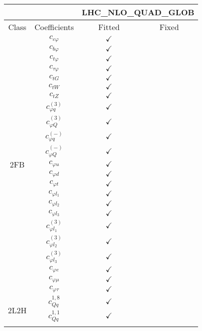 \documentclass{article}
\begin{document}
\begin{table}[H]
\centering
\begin{tabular}{|c|c|c|c|}
\hline
 &  & \multicolumn{2}{c|}{LHC_NLO_QUAD_GLOB} \\ \hline
Class & Coefficients & Fitted & Fixed  \\ \hline
\multirow{23}{*}{2FB}
 & $c_{c \varphi}$ & $\checkmark$ & \\ \cline{2-4}
 & $c_{b \varphi}$ & $\checkmark$ & \\ \cline{2-4}
 & $c_{t \varphi}$ & $\checkmark$ & \\ \cline{2-4}
 & $c_{\tau \varphi}$ & $\checkmark$ & \\ \cline{2-4}
 & $c_{tG}$ & $\checkmark$ & \\ \cline{2-4}
 & $c_{tW}$ & $\checkmark$ & \\ \cline{2-4}
 & $c_{tZ}$ & $\checkmark$ & \\ \cline{2-4}
 & $c_{\varphi q}^{(3)}$ & $\checkmark$ & \\ \cline{2-4}
 & $c_{\varphi Q}^{(3)}$ & $\checkmark$ & \\ \cline{2-4}
 & $c_{\varphi q}^{(-)}$ & $\checkmark$ & \\ \cline{2-4}
 & $c_{\varphi Q}^{(-)}$ & $\checkmark$ & \\ \cline{2-4}
 & $c_{\varphi u}$ & $\checkmark$ & \\ \cline{2-4}
 & $c_{\varphi d}$ & $\checkmark$ & \\ \cline{2-4}
 & $c_{\varphi t}$ & $\checkmark$ & \\ \cline{2-4}
 & $c_{\varphi l_1}$ & $\checkmark$ & \\ \cline{2-4}
 & $c_{\varphi l_2}$ & $\checkmark$ & \\ \cline{2-4}
 & $c_{\varphi l_3}$ & $\checkmark$ & \\ \cline{2-4}
 & $c_{\varphi l_1}^{(3)}$ & $\checkmark$ & \\ \cline{2-4}
 & $c_{\varphi l_2}^{(3)}$ & $\checkmark$ & \\ \cline{2-4}
 & $c_{\varphi l_3}^{(3)}$ & $\checkmark$ & \\ \cline{2-4}
 & $c_{\varphi e}$ & $\checkmark$ & \\ \cline{2-4}
 & $c_{\varphi \mu}$ & $\checkmark$ & \\ \cline{2-4}
 & $c_{\varphi \tau}$ & $\checkmark$ & 
\\ \hline
\multirow{14}{*}{2L2H}
 & $c_{Qq}^{1,8}$ & $\checkmark$ & \\ \cline{2-4}
 & $c_{Qq}^{1,1}$ & $\checkmark$ & \\ \cline{2-4}

\end{tabular}
\end{table}
\end{document}
